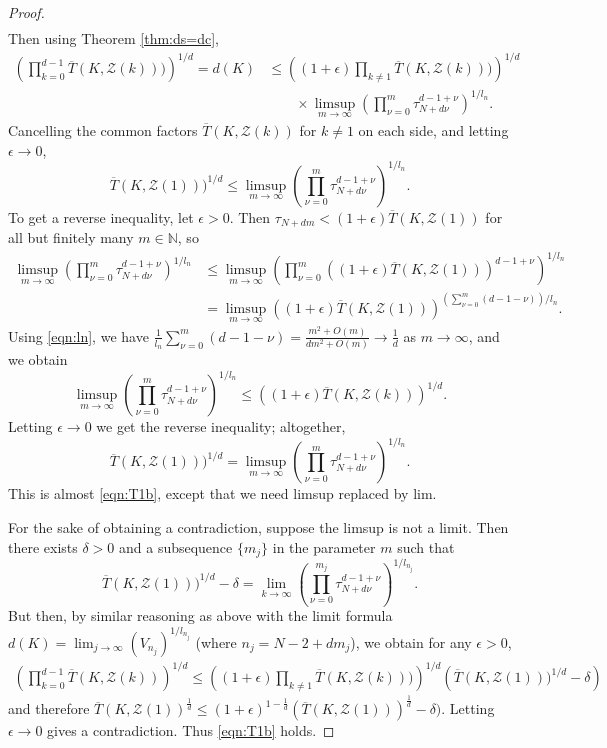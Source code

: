\documentclass[12pt]{article}
\numberwithin{equation}{section}
\newcommand{\N}{\mathbb{N}}
\newcommand{\calZ}{\mathcal{Z}}
\begin{document}
\begin{proof}
$$\begin{aligned}
\end{aligned}$$ 
Then using Theorem \ref{thm:ds=dc}, 
$$\begin{aligned}
\left(\prod_{k=0}^{d-1} \overline T(K,\calZ(k)))\right)^{1/d}  =d(K)
& \leq \left((1+\epsilon)\prod_{k\neq 1} \overline T(K,\calZ(k)))\right)^{1/d} \\ 
&\qquad \times \limsup_{m\to\infty}\left(\prod_{\nu=0}^m \tau_{N+d\nu}^{d-1+\nu} \right)^{1/l_n}. 
\end{aligned}$$  Cancelling the common factors $\overline T(K,\calZ(k))$ for $k\neq 1$ on each side, and letting $\epsilon\to 0$, 
$$
\overline T(K,\calZ(1)))^{1/d} \leq \limsup_{m\to\infty}\left(\prod_{\nu=0}^m \tau_{N+d\nu}^{d-1+\nu} \right)^{1/l_n}.
$$
To get  a reverse inequality, let $\epsilon>0$.  Then $\tau_{N+dm}<(1+\epsilon)\overline T(K,\calZ(1))$ for all but finitely many $m\in\N$, so  
$$\begin{aligned}
\limsup_{m\to\infty}\left(\prod_{\nu=0}^m \tau_{N+d\nu}^{d-1+\nu} \right)^{1/l_n} &\leq \limsup_{m\to\infty}  \left(\prod_{\nu=0}^m ((1+\epsilon)\overline T(K,\calZ(1)))^{d-1+\nu}  \right)^{1/l_n} \\
& =    \limsup_{m\to\infty}\left( (1+\epsilon)\overline T(K,\calZ(1)) \right)^{\left(\sum_{\nu=0}^{m}(d-1-\nu)\right)/l_n }.
\end{aligned}$$ 
Using \eqref{eqn:ln}, we have  $\frac{1}{l_n}\sum_{\nu=0}^{m}(d-1-\nu)= \frac{m^2+O(m)}{dm^2+O(m)}\to \frac{1}{ d}$  as $m\to\infty$,  
 and we obtain  $$\limsup\limits_{m\to\infty}\left(\prod_{\nu=0}^m \tau_{N+d\nu}^{d-1+\nu} \right)^{1/l_n}\leq \left((1+\epsilon)\overline T(K,\calZ(k))\right)^{1/d}.$$  Letting $\epsilon\to 0$ we get the reverse inequality; altogether, 
$$
\overline T(K,\calZ(1)))^{1/d} = \limsup_{m\to\infty}\left(\prod_{\nu=0}^m \tau_{N+d\nu}^{d-1+\nu} \right)^{1/l_n}.
$$
This is almost \eqref{eqn:T1b}, except that we need limsup replaced by lim.  

For the sake of obtaining a contradiction, suppose the limsup is not a limit. Then there exists $\delta>0$ and 
a subsequence $\{m_j\}$ in the parameter $m$ such that 
$$
\overline T(K,\calZ(1)))^{1/d}-\delta = \lim_{k\to\infty} \left(\prod_{\nu=0}^{m_j} \tau_{N+d\nu}^{d-1+\nu} \right)^{1/l_{n_j}}.
$$
But then, by similar reasoning as above with the limit formula $d(K)=\lim_{j\to\infty} (V_{n_j})^{1/l_{n_j}}$ (where $n_j=N-2+dm_j$),  we obtain for any $\epsilon>0$, 
$$\begin{aligned}
\left(\prod_{k=0}^{d-1} \overline T(K,\calZ(k))\right)^{1/d}  
 \leq \left((1+\epsilon)\prod_{k\neq 1} \overline T(K,\calZ(k)))\right)^{1/d}  
\left(\overline T(K,\calZ(1)))^{1/d}-\delta\right)
\end{aligned}$$
and therefore $\overline T(K,\calZ(1))^{\frac{1}{d}}\leq (1+\epsilon)^{1-\frac{1}{d}}(\overline T(K,\calZ(1)))^{\frac{1}{d}}-\delta )$.  
Letting $\epsilon\to 0$ gives a contradiction.  Thus \eqref{eqn:T1b} holds.  


\end{proof}
\end{document}

